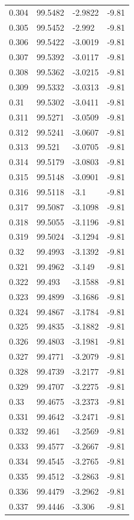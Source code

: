 \begin{tabular}{llll}
0.304 & 99.5482 & -2.9822 & -9.81 \\
0.305 & 99.5452 & -2.992 & -9.81 \\
0.306 & 99.5422 & -3.0019 & -9.81 \\
0.307 & 99.5392 & -3.0117 & -9.81 \\
0.308 & 99.5362 & -3.0215 & -9.81 \\
0.309 & 99.5332 & -3.0313 & -9.81 \\
0.31 & 99.5302 & -3.0411 & -9.81 \\
0.311 & 99.5271 & -3.0509 & -9.81 \\
0.312 & 99.5241 & -3.0607 & -9.81 \\
0.313 & 99.521 & -3.0705 & -9.81 \\
0.314 & 99.5179 & -3.0803 & -9.81 \\
0.315 & 99.5148 & -3.0901 & -9.81 \\
0.316 & 99.5118 & -3.1 & -9.81 \\
0.317 & 99.5087 & -3.1098 & -9.81 \\
0.318 & 99.5055 & -3.1196 & -9.81 \\
0.319 & 99.5024 & -3.1294 & -9.81 \\
0.32 & 99.4993 & -3.1392 & -9.81 \\
0.321 & 99.4962 & -3.149 & -9.81 \\
0.322 & 99.493 & -3.1588 & -9.81 \\
0.323 & 99.4899 & -3.1686 & -9.81 \\
0.324 & 99.4867 & -3.1784 & -9.81 \\
0.325 & 99.4835 & -3.1882 & -9.81 \\
0.326 & 99.4803 & -3.1981 & -9.81 \\
0.327 & 99.4771 & -3.2079 & -9.81 \\
0.328 & 99.4739 & -3.2177 & -9.81 \\
0.329 & 99.4707 & -3.2275 & -9.81 \\
0.33 & 99.4675 & -3.2373 & -9.81 \\
0.331 & 99.4642 & -3.2471 & -9.81 \\
0.332 & 99.461 & -3.2569 & -9.81 \\
0.333 & 99.4577 & -3.2667 & -9.81 \\
0.334 & 99.4545 & -3.2765 & -9.81 \\
0.335 & 99.4512 & -3.2863 & -9.81 \\
0.336 & 99.4479 & -3.2962 & -9.81 \\
0.337 & 99.4446 & -3.306 & -9.81 \\

\end{tabular}
